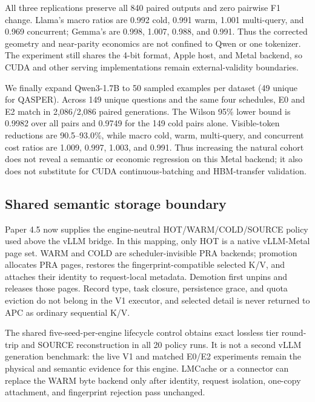 \documentclass[10pt]{article}
\begin{document}
\begin{table}[t]
\centering
\small
\caption{Matched E2/E0 execution across four checkpoints and three model
families. Lower cost ratios are better. Each row contains 840 paired requests.}
\resizebox{\linewidth}{!}{%
}
\label{tab:vllm-cross-model}
\end{table}

All three replications preserve all 840 paired outputs and zero pairwise F1
change. Llama's macro ratios are 0.992 cold, 0.991 warm, 1.001 multi-query,
and 0.969 concurrent; Gemma's are 0.998, 1.007, 0.988, and 0.991. Thus the
corrected geometry and near-parity economics are not confined to Qwen or one
tokenizer. The experiment still shares the 4-bit format, Apple host, and Metal
backend, so CUDA and other serving implementations remain external-validity
boundaries.

We finally expand Qwen3-1.7B to 50 sampled examples per dataset (49 unique for
QASPER). Across 149 unique questions and the same four schedules, E0 and E2
match in 2,086/2,086 paired generations. The Wilson 95\% lower bound is 0.9982
over all pairs and 0.9749 for the 149 cold pairs alone. Visible-token reductions
are 90.5--93.0\%, while macro cold, warm, multi-query, and concurrent cost
ratios are 1.009, 0.997, 1.003, and 0.991. Thus increasing the natural cohort
does not reveal a semantic or economic regression on this Metal backend; it
also does not substitute for CUDA continuous-batching and HBM-transfer
validation.

\subsection{Shared semantic storage boundary}
Paper 4.5 now supplies the engine-neutral HOT/WARM/COLD/SOURCE policy used above
the vLLM bridge. In this mapping, only HOT is a native vLLM-Metal page set.
WARM and COLD are scheduler-invisible PRA backends; promotion allocates PRA
pages, restores the fingerprint-compatible selected K/V, and attaches their
identity to request-local metadata. Demotion first unpins and releases those
pages. Record type, task closure, persistence grace, and quota eviction do not
belong in the V1 executor, and selected detail is never returned to APC as
ordinary sequential K/V.

The shared five-seed-per-engine lifecycle control obtains exact lossless tier
round-trip and SOURCE reconstruction in all 20 policy runs. It is not a second
vLLM generation benchmark: the live V1 and matched E0/E2 experiments remain the
physical and semantic evidence for this engine. LMCache or a connector can
replace the WARM byte backend only after identity, request isolation,
one-copy attachment, and fingerprint rejection pass unchanged.
\end{document}
